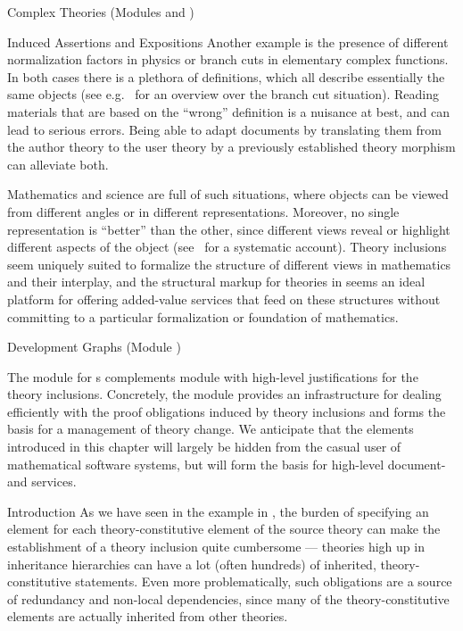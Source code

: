 \begin{tchapter}[id=complex-theories,short=Complex Theories]{Complex Theories (Modules
    {} and {})}
\begin{tsection}[id=induced-assertions,short=Induced Assertions]{Induced Assertions and Expositions}
Another example is the presence of different normalization factors in physics or branch
cuts in elementary complex functions. In both cases there is a plethora of definitions,
which all describe essentially the same objects (see e.g.~\cite{BraCor:raefca02} for an
overview over the branch cut situation). Reading materials that are based on the ``wrong''
definition is a nuisance at best, and can lead to serious errors. Being able to adapt
documents by translating them from the author theory to the user theory by a previously
established theory morphism can alleviate both.

Mathematics and science are full of such situations, where objects can be viewed from
different angles or in different representations. Moreover, no single representation is
``better'' than the other, since different views reveal or highlight different aspects of
the object (see~\cite{KohKoh:esmk05} for a systematic account). Theory inclusions seem
uniquely suited to formalize the structure of different views in mathematics and their
interplay, and the structural markup for theories in {\omdoc} seems an ideal platform for
offering added-value services that feed on these structures without committing to a
particular formalization or foundation of mathematics.
\end{tsection}

\begin{tsection}[id=development-graphs,short=Development Graphs]{Development Graphs
    (Module {})}
  
  The {\omdoc} module {} for {s} complements
  module {} with high-level justifications for the theory inclusions.
  Concretely, the module provides an infrastructure for dealing efficiently with the proof
  obligations induced by theory inclusions and forms the basis for a management of theory
  change. We anticipate that the elements introduced in this
  chapter will largely be hidden from the casual user of mathematical software systems,
  but will form the basis for high-level document- and
  {} services.


\begin{tsubsection}[id=dg-intro,short=Introduction]{Introduction}
  As we have seen in the example in {}, the burden of
  specifying an {} element for each theory-constitutive element of the
  source theory can make the establishment of a theory inclusion quite cumbersome ---
  theories high up in inheritance hierarchies can have a lot (often hundreds) of inherited,
  theory-constitutive statements.  Even more problematically, such obligations are a
  source of redundancy and non-local dependencies, since many of the theory-constitutive
  elements are actually inherited from other theories.
  

\end{tsubsection}
\end{tsection}
\end{tchapter}
